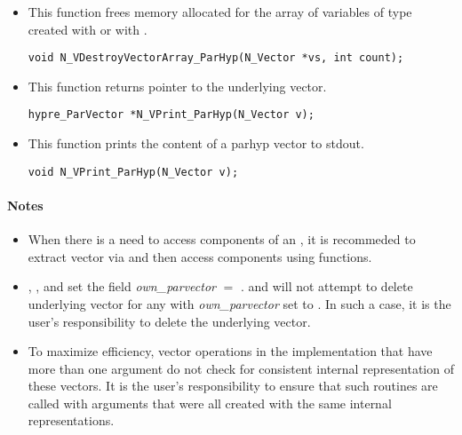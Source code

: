 \begin{itemize}

\item {}
 
 This function frees memory allocated for the array of   variables of
 type  created with  or with
 .
 

 \verb|void N_VDestroyVectorArray_ParHyp(N_Vector *vs, int count);|



\item {}
  
  This function returns pointer to the underlying {\hypre} vector.
 
    
  \verb|hypre_ParVector *N_VPrint_ParHyp(N_Vector v);|



\item {}
  
  This function prints the content of a parhyp vector to stdout.
 
    
  \verb|void N_VPrint_ParHyp(N_Vector v);|


\end{itemize}
\paragraph{\bf Notes} 
           
\begin{itemize}
                                        
\item
  When there is a need to access components of an  , 
  it is recommeded to extract {\hypre} vector via       
   and then access components using 
  {\hypre} functions.        
                                                               
\item
  {\warn}, , 
  and  set the field 
  {\em own\_parvector} $=$ . 
   and 
  will not attempt to delete underlying {\hypre} vector for any  
  with {\em own\_parvector} set to . In such a case, it is the 
  user's responsibility to delete the underlying vector.

\item
  {\warn}To maximize efficiency, vector operations in the {\nvecph} implementation
  that have more than one  argument do not check for
  consistent internal representation of these vectors. It is the user's 
  responsibility to ensure that such routines are called with 
  arguments that were all created with the same internal representations.

\end{itemize}

